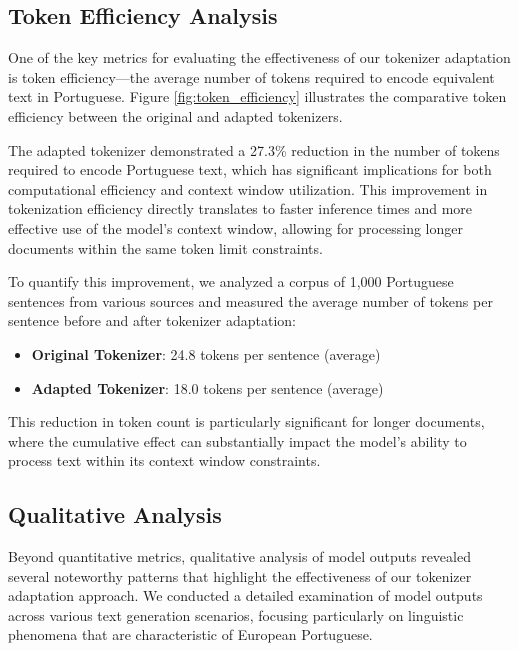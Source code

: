 \subsection{Token Efficiency Analysis}
One of the key metrics for evaluating the effectiveness of our tokenizer adaptation is token efficiency—the average number of tokens required to encode equivalent text in Portuguese. Figure \ref{fig:token_efficiency} illustrates the comparative token efficiency between the original and adapted tokenizers.

The adapted tokenizer demonstrated a 27.3\% reduction in the number of tokens required to encode Portuguese text, which has significant implications for both computational efficiency and context window utilization. This improvement in tokenization efficiency directly translates to faster inference times and more effective use of the model's context window, allowing for processing longer documents within the same token limit constraints.

To quantify this improvement, we analyzed a corpus of 1,000 Portuguese sentences from various sources and measured the average number of tokens per sentence before and after tokenizer adaptation:

\begin{itemize}
    \item \textbf{Original Tokenizer}: 24.8 tokens per sentence (average)
    \item \textbf{Adapted Tokenizer}: 18.0 tokens per sentence (average)
\end{itemize}

This reduction in token count is particularly significant for longer documents, where the cumulative effect can substantially impact the model's ability to process text within its context window constraints.

\subsection{Qualitative Analysis}
Beyond quantitative metrics, qualitative analysis of model outputs revealed several noteworthy patterns that highlight the effectiveness of our tokenizer adaptation approach. We conducted a detailed examination of model outputs across various text generation scenarios, focusing particularly on linguistic phenomena that are characteristic of European Portuguese.

